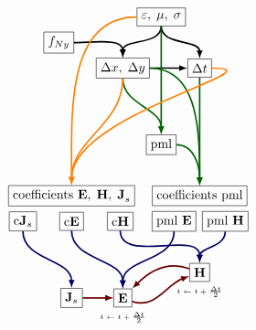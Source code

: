 \documentclass[10pt]{article}
\begin{document}
\[\begin{tikzpicture}[>=latex]
%
\node[rectangle,draw,minimum size=0.5cm] at (0,0)  (p) {$\varepsilon,\;\mu,\;\sigma$};
\node[rectangle,draw,minimum size=0.5cm] at (-8em,-2em)  (f) {$f_{Ny}$};
\node[rectangle,draw,minimum size=0.5cm] at (-3em,-4em)  (dxdy) {$\Delta x,\;\Delta y$};
\node[rectangle,draw,minimum size=0.5cm] at (3em,-4em)  (dt) {$\Delta t$};
\node[rectangle,draw,minimum size=0.5cm] at (0,-10em)  (pml) {pml};
\node[rectangle,draw,minimum size=0.5cm] at (3em,-14em)  (cpml) {coefficients pml};
\node[rectangle,draw,minimum size=0.5cm] at (1em,-16em)  (pmlE) {pml ${\bf E}$};
\node[rectangle,draw,minimum size=0.5cm] at (5em,-16em)  (pmlH) {pml ${\bf H}$};
\node[rectangle,draw,minimum size=0.5cm] at (-7em,-14em)  (cEHJ) {coefficients ${\bf E,\; H,\; J}_s$};
\node[rectangle,draw,minimum size=0.5cm] at (-10.8em,-16em)  (cJ) {c${\bf J}_s$};
\node[rectangle,draw,minimum size=0.5cm] at (-7em,-16em)  (cE) {c${\bf E}$};
\node[rectangle,draw,minimum size=0.5cm] at (-3.2em,-16em)  (cH) {c${\bf H}$};
%
\node[rectangle,draw,minimum size=0.5cm] at (3em,-20em)  (H) {${\bf H}$};
\node[minimum size=0.5cm] at (3em,-21.5em)  () {\tiny{$t\leftarrow t+\frac{\Delta t}{2}$}};
\node[rectangle,draw,minimum size=0.5cm] at (-3em,-22em)  (E) {${\bf E}$};
\node[minimum size=0.5cm] at (-3em,-23.5em)  () {\tiny{$t\leftarrow t+\frac{\Delta t}{2}$}};
\node[rectangle,draw,minimum size=0.5cm] at (-7em,-22em)  (J) {${\bf J}_s$};
%
\draw[->,very thick,black]
  (p) to[out=270,in=90] (dxdy);
\draw[->,very thick,black]
  (f) to[out=0,in=90] (dxdy);
\draw[->,very thick,black]
  (p) to[out=270,in=90] (dt);
\draw[->,very thick,black]
  (dxdy) to[out=0,in=180] (dt);
\draw[->,very thick,black!60!green]
  (p) to[out=270,in=90] (pml);
\draw[->,very thick,black!60!green]
  (dxdy) to[out=270,in=90] (pml);
\draw[->,very thick,black!60!green]
  (pml) to[out=0,in=90] (cpml);
\draw[->,very thick,black!60!green]
  (dt) to[out=270,in=90] (cpml);
\draw[->,very thick,black!60!green]
  (dxdy) to[out=0,in=90] (cpml);
\draw[->,very thick,orange]
  (dxdy) to[out=270,in=90] (cEHJ);
\draw[->,very thick,orange]
  (p) to[out=180,in=90] (cEHJ);
\draw[->,very thick,orange]
  (dt) to[out=0,in=90] (cEHJ);
%
\draw[->,very thick,black!60!blue]
  (pmlH) to[out=270,in=90] (H);
\draw[->,very thick,black!60!blue]
  (cH) to[out=270,in=90] (H);
\draw[->,very thick,black!60!blue]
  (cE) to[out=270,in=90] (E);
\draw[->,very thick,black!60!blue]
  (pmlE) to[out=270,in=90] (E);
\draw[->,very thick,black!60!blue]
  (cJ) to[out=270,in=90] (J);
\draw[->,very thick,black!60!red]
  (J) to[out=0,in=180] (E);
\draw[->,very thick,black!60!red]
  (H) to[out=160,in=45] (E);
\draw[->,very thick,black!60!red]
  (E) to[out=-20,in=200] (H);
%
\end{tikzpicture}
\]
\end{document}
